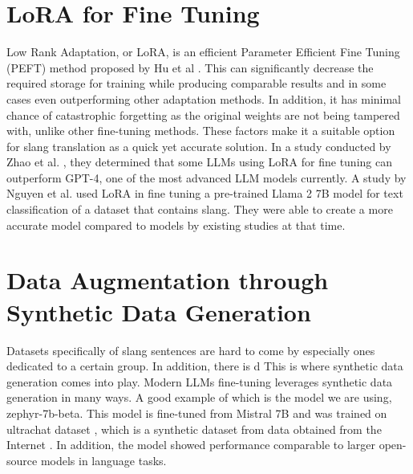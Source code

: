 \section{LoRA for Fine Tuning}
Low Rank Adaptation, or LoRA, is an efficient Parameter Efficient Fine Tuning (PEFT) method proposed by Hu et al \cite{hu2021loralowrankadaptationlarge}.
This can significantly decrease the required storage for training while producing comparable results and in some cases even outperforming other adaptation methods.
In addition, it has minimal chance of catastrophic forgetting as the original weights are not being tampered with, unlike other fine-tuning methods.
These factors make it a suitable option for slang translation as a quick yet accurate solution.
In a study conducted by Zhao et al. \cite{zhao2024loraland310finetuned}, they determined that some LLMs using LoRA for fine tuning can outperform GPT-4, one of the most advanced LLM models currently.
A study by Nguyen et al. \cite{nguyen2023finetuningllama2large} used LoRA in fine tuning a pre-trained Llama 2 7B model for text classification of a dataset that contains slang.
They were able to create a more accurate model compared to models by existing studies at that time. 

\section{Data Augmentation through Synthetic Data Generation}
Datasets specifically of slang sentences are hard to come by especially ones dedicated to a certain group. In addition, there is d This is where synthetic data generation comes into play.  Modern LLMs fine-tuning leverages synthetic data generation in many ways. A good example of which is the model we are using, zephyr-7b-beta. This model is fine-tuned from Mistral 7B and was trained on ultrachat dataset \cite{tunstall2023zephyr}, which is a synthetic dataset from data obtained from the Internet \cite{ding2023enhancing}. In addition, the model showed performance comparable to larger open-source models in language tasks. 

